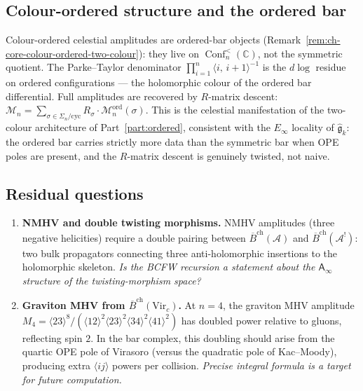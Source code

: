 \documentclass[11pt]{article}
\newcommand{\cA}{\mathcal{A}}
\newcommand{\cM}{\mathcal{M}}
\newcommand{\fg}{\mathfrak{g}}
\newcommand{\barB}{\overline{B}}
\newcommand{\C}{\mathbb{C}}
\newcommand{\Ainf}{\mathsf{A}_{\infty}}
\providecommand{\barBch}{\barB^{\mathrm{ch}}}
\DeclareMathOperator{\Conf}{Conf}
\begin{document}
\subsection*{Colour-ordered structure and the ordered bar}

Colour-ordered celestial amplitudes are ordered-bar objects
(Remark~\ref{rem:ch-core-colour-ordered-two-colour}): they live on
$\Conf_n^{<}(\C)$, not the symmetric quotient.  The Parke--Taylor
denominator $\prod_{i=1}^n \langle i,\, i{+}1\rangle^{-1}$ is the
$d\log$ residue on ordered configurations --- the holomorphic colour
of the ordered bar differential.  Full amplitudes are recovered by
$R$-matrix descent: $\cM_n = \sum_{\sigma \in \Sigma_n/\mathrm{cyc}}
R_\sigma \cdot \cM_n^{\mathrm{ord}}(\sigma)$.  This is the celestial
manifestation of the two-colour architecture of Part~\ref{part:ordered},
consistent with the $E_\infty$ locality of $\widehat{\fg}_k$: the
ordered bar carries strictly more data than the symmetric bar when OPE
poles are present, and the $R$-matrix descent is genuinely
twisted, not naive.

\subsection*{Residual questions}

\begin{enumerate}[label=(\alph*),nosep]
\item \textbf{NMHV and double twisting morphisms.}
  NMHV amplitudes (three negative helicities) require a double
  pairing between $\barBch(\cA)$ and $\barBch(\cA^!)$: two bulk
  propagators connecting three anti-holomorphic insertions to the
  holomorphic skeleton.  \emph{Is the BCFW recursion a statement
  about the $\Ainf$ structure of the twisting-morphism space?}

\item \textbf{Graviton MHV from $\barBch(\mathrm{Vir}_c)$.}
  At $n = 4$, the graviton MHV amplitude
  $M_4 = \langle 23\rangle^8 /
  (\langle 12\rangle^2 \langle 23\rangle^2
  \langle 34\rangle^2 \langle 41\rangle^2)$
  has doubled power relative to gluons, reflecting spin $2$.  In the
  bar complex, this doubling should arise from the quartic OPE pole
  of Virasoro (versus the quadratic pole of Kac--Moody), producing
  extra $\langle ij\rangle$ powers per collision.  \emph{Precise integral
  formula is a target for future computation.}
\end{enumerate}


\end{document}
